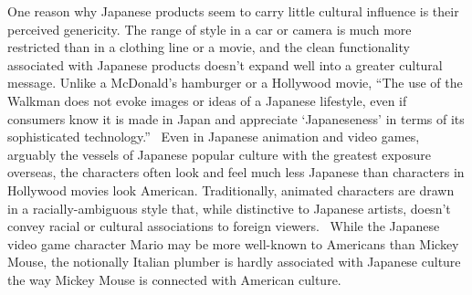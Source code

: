 \documentclass[12pt]{article}
\begin{document}
One reason why Japanese products seem to carry little cultural influence is their perceived genericity.  The range of style in a car or camera is much more restricted than in a clothing line or a movie, and the clean functionality associated with Japanese products doesn't expand well into a greater cultural message.  Unlike a McDonald's hamburger or a Hollywood movie, ``The use of the Walkman does not evoke images or ideas of a Japanese lifestyle, even if consumers know it is made in Japan and appreciate `Japaneseness' in terms of its sophisticated technology.''~\cRecentering{\citep[pg.\ 28]}
Even in Japanese animation and video games, arguably the vessels of Japanese popular culture with the greatest exposure overseas, the characters often look and feel much less Japanese than characters in Hollywood movies look American.  Traditionally, animated characters are drawn in a racially-ambiguous style that, while distinctive to Japanese artists, doesn't convey racial or cultural associations to foreign viewers.~\cRecentering{\citep[pg.\ 28]}  While the Japanese video game character Mario may be more well-known to Americans than Mickey Mouse, %
the notionally Italian plumber is hardly associated with Japanese culture the way Mickey Mouse is connected with American culture.
\end{document}
